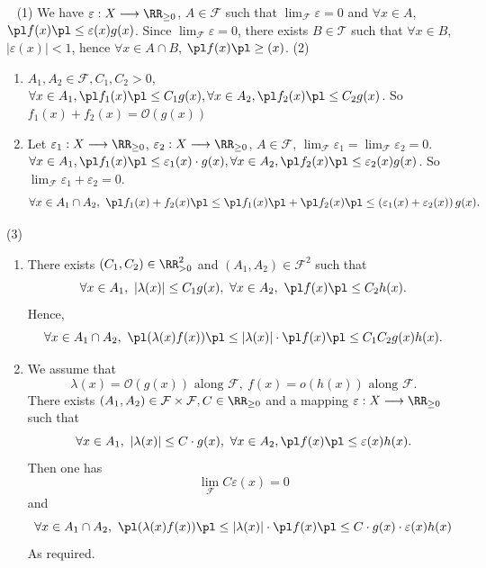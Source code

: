 \begin{proofenv}
    \ \newline
    (1) We have $\varepsilon: X\longrightarrow \RR_{\ge 0}$, $A\in \mathcal{F}$ such that $\lim_{\mathcal{F}}\varepsilon=0$ and $\forall x\in A$, $\pl f(x)\pl\le \varepsilon (x)g(x)$. Since $\lim_{\mathcal{F}}\varepsilon=0$, there exists $B\in \mathscr{T}$ such that $\forall x\in B$, $\left|\varepsilon(x)\right|<1$, hence $\forall x\in A\cap B$, $\pl f(x)\pl\ge (x)$.
    \newline
    (2)
    \begin{enumerate}
        \item $A_1,A_2\in \mathcal{F}, C_1,C_2>0$, $\forall x\in A_1, \pl f_1(x)\pl\le C_1g(x), \forall x\in A_2, \pl f_2(x)\pl\le C_2g(x)$. So $f_1(x)+f_2(x)=\mathcal{O}(g(x))$
        \item Let $\varepsilon_1:X\longrightarrow \RR_{\ge 0}$, $\varepsilon_2:X\longrightarrow \RR_{\ge 0}$, $A\in \mathcal{F}$, $\lim_{\mathcal{F}}\varepsilon_1=\lim_{\mathcal{F}}\varepsilon_2=0$. $\forall x\in A_1, \pl f_1(x)\pl\le \varepsilon_1(x)\cdot g(x), \forall x\in A_2, \pl f_2(x)\pl\le \varepsilon_2(x)g(x)$. So $\lim_{\mathcal{F}}\varepsilon_1+\varepsilon_2=0$.
            $$\forall x\in A_1\cap A_2,\ \pl f_1(x)+f_2(x)\pl \le \pl f_1(x)\pl+\pl f_2(x)\pl\le \left(\varepsilon_1(x)+\varepsilon_2(x)\right)g(x).$$
    \end{enumerate}
    (3) 
    \begin{enumerate}
        \item There exists $(C_1,C_2)\in \RR_{>0}^2$ and $(A_1,A_2)\in \mathcal{F}^2$ such that
            $$\forall x\in A_1,\ \left|\lambda(x)\right|\le C_1 g(x),\ \forall x\in A_2,\ \pl f(x)\pl\le C_2 h(x).$$
            Hence, 
            $$\forall x\in A_1\cap A_2,\ \pl (\lambda(x)f(x))\pl \le \left|\lambda(x)\right|\cdot \pl f(x)\pl \le C_1 C_2 g(x) h(x).$$
        \item We assume that 
            $$\lambda(x)=\mathcal{O}\left(g(x)\right)\text{ along }\mathcal{F},\ f(x)=o\left(h(x)\right) \text{ along }\mathcal{F}.$$
            There exists $(A_1,A_2)\in \mathcal{F}\times \mathcal{F}, C\in \RR_{\ge 0}$ and a mapping $\varepsilon:X\longrightarrow \RR_{\ge 0}$ such that 
            $$\forall x\in A_1,\  \left|\lambda(x)\right|\le C\cdot g(x),\ \forall x\in A_2, \pl f(x)\pl\le \varepsilon(x)h(x).$$
            Then one has 
            $$\lim_{\mathcal{F}}C\varepsilon(x)=0$$
            and 
            $$\forall x\in A_1\cap A_2,\ \pl (\lambda(x)f(x))\pl\le \left|\lambda(x)\right|\cdot \pl f(x)\pl\le C\cdot g(x)\cdot \varepsilon(x)h(x)$$
            As required. 
    \end{enumerate}
\end{proofenv}
